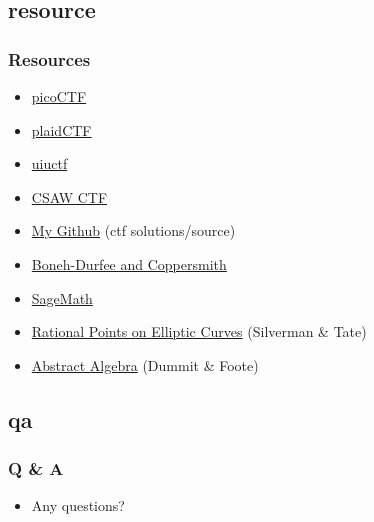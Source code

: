 \documentclass[aspectratio=169,t]{beamer}
\begin{document}
\subsection{resource}
\begin{frame}
\frametitle{Resources}
\begin{itemize}
\item
\href{https://picoctf.com/}{picoCTF}
\item
\href{http://plaidctf.com/}{plaidCTF}
\item
\href{https://uiuc.tf/contests/uiuctf-2017/}{uiuctf}
\item
\href{https://ctf.csaw.io/}{CSAW CTF}
\item
\href{https://github.com/incertia/}{My Github} (ctf solutions/source)
\item
\href{https://github.com/mimoo/RSA-and-LLL-attacks}{Boneh-Durfee and
Coppersmith}
\item
\href{http://www.sagemath.org/}{SageMath}
\item
\href{https://www.amazon.com/dp/0387978259}{Rational Points on Elliptic Curves}
(Silverman \& Tate)
\item
\href{https://www.amazon.com/dp/0471433349/}{Abstract Algebra} (Dummit \& Foote)
\end{itemize}
\end{frame}

\subsection{qa}
\begin{frame}
\frametitle{Q \& A}
\begin{itemize}
\item
Any questions?
\end{itemize}
\end{frame}
\end{document}
